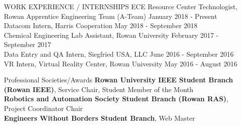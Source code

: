 \documentclass{resume} %
\begin{document}

\begin{rSection}{WORK EXPERIENCE / INTERNSHIPS} \itemsep -3pt
{ECE Resource Center Technologist, Rowan Apprentice Engineering Team (A-Team)} \hfill January 2018 - Present\\
{Datacom Intern, Harris Cooperation} \hfill May 2018 - September 2018\\
{Chemical Engineering Lab Assistant, Rowan University} \hfill February 2017 - September 2017\\
{Data Entry and QA Intern, Siegfried USA, LLC} \hfill June 2016 - September 2016\\
{VR Intern, Virtual Reality Center, Rowan University} \hfill May 2016 - August 2016
\end{rSection}

\begin{rSection}{Professional Societies/Awards} \itemsep -3pt
{\textbf{Rowan University IEEE Student Branch (Rowan IEEE)}, Service Chair, Student Member of the Month}\\
{\textbf{Robotics and Automation Society Student Branch (Rowan RAS)}, Project Coordinator Chair}\\
{\textbf{Engineers Without Borders Student Branch}, Web Master}\\
\end{rSection}
\end{document}
